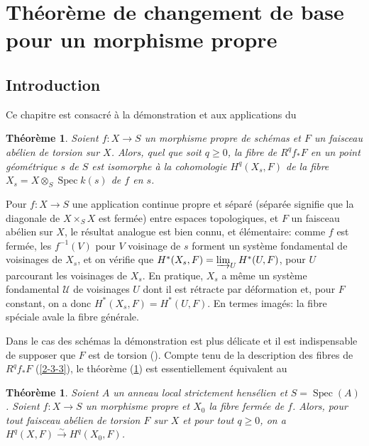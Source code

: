 \documentclass{article}
\DeclareMathOperator{\spec}{Spec}
\newcommand{\cU}{\mathcal{U}}
\newcommand{\iso}{\xrightarrow\sim}
\newtheorem{theorem}[subsubsection]{Théorème}
\begin{document}
\section{Théorème de changement de base pour un morphisme propre}\label{4}










\subsection{Introduction}\label{4-1}

Ce chapitre est consacré à la démonstration et aux applications du 





\begin{theorem}\label{4-1-1}
Soient $f:X\to S$ un morphisme propre de schémas et $F$ un faisceau abélien 
de torsion sur $X$. Alors, quel que soit $q\geqslant 0$, la fibre de 
$R^q f_* F$ en un point géométrique $s$ de $S$ est isomorphe à la 
cohomologie $H^q(X_s,F)$ de la fibre $X_s=X\otimes_S \spec k(s)$ de $f$ en 
$s$. 
\end{theorem}

Pour $f:X\to S$ une application continue propre et séparé (séparée 
signifie que la diagonale de $X\times_S X$ est fermée) entre espaces 
topologiques, et $F$ un faisceau abélien sur $X$, le résultat analogue est 
bien connu, et élémentaire: comme $f$ est fermée, les $f^{-1}(V)$ pour 
$V$ voisinage de $s$ forment un système fondamental de voisinages de $X_s$, et 
on vérifie que $H^*(X_s,F) = \varinjlim_U H^*(U,F)$, pour $U$ parcourant les 
voisinages de $X_s$. En pratique, $X_s$ a même un système fondamental 
$\cU$ de voisinages $U$ dont il est rétracte par déformation et, pour $F$ 
constant, on a donc $H^*(X_s,F)=H^*(U,F)$. En termes imagés: la fibre 
spéciale avale la fibre générale. 

Dans le cas des schémas la démonstration est plus délicate et il est 
indispensable de supposer que $F$ est de torsion (\cite[XII.2]{4}). Compte 
tenu de la description des fibres de $R^q f_* F$ (\ref{2-3-3}), le théorème 
(\ref{4-1-1}) est essentiellement équivalent au 

 
  
   
    
\begin{theorem}\label{4-1-2}
Soient $A$ un anneau local strictement hensélien et $S=\spec(A)$. Soient 
$f:X\to S$ un morphisme propre et $X_0$ la fibre fermée de $f$. Alors, pour 
tout faisceau abélien de torsion $F$ sur $X$ et pour tout $q\geqslant 0$, on 
a $H^q(X,F) \iso H^q(X_0,F)$. 
\end{theorem} 
\end{document}
